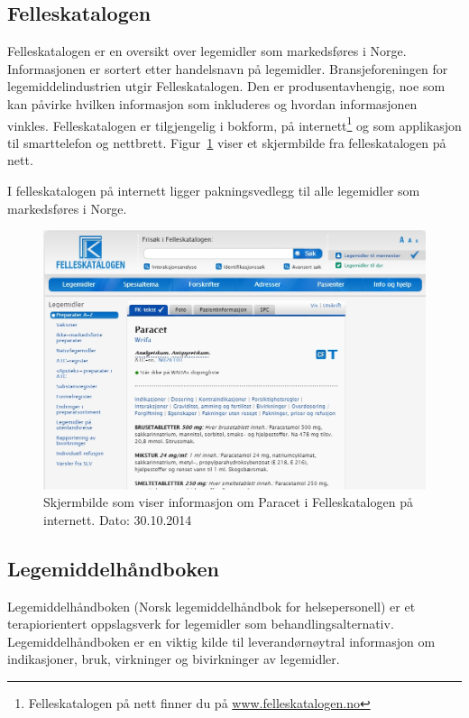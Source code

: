 \subsection{Felleskatalogen}
Felleskatalogen er en oversikt over legemidler som markedsføres i Norge. Informasjonen er sortert etter handelsnavn på legemidler. Bransjeforeningen for legemiddelindustrien utgir Felleskatalogen. Den er produsentavhengig, noe som kan påvirke hvilken informasjon som inkluderes og hvordan informasjonen vinkles. Felleskatalogen er tilgjengelig i bokform, på internett\footnote{Felleskatalogen på nett finner du på \url{www.felleskatalogen.no}} og som applikasjon til smarttelefon og nettbrett. Figur~\ref{fig:felleskatalogen} viser et skjermbilde fra felleskatalogen på nett. 

I felleskatalogen på internett ligger pakningsvedlegg til alle legemidler som markedsføres i Norge. 

\begin{figure}[H]
  \centering
    \includegraphics[width=1\textwidth]{fig/dagens/paracetFelleskatalog.jpg}
  \caption{Skjermbilde som viser informasjon om Paracet i Felleskatalogen på internett. Dato: 30.10.2014}
\label{fig:felleskatalogen}
\end{figure}


\subsection{Legemiddelhåndboken}
Legemiddelhåndboken (Norsk legemiddelhåndbok for helsepersonell) er et terapiorientert oppslagsverk for legemidler som behandlingsalternativ. Legemiddelhåndboken er en viktig kilde til leverandørnøytral informasjon om indikasjoner, bruk, virkninger og bivirkninger av legemidler. 
 
